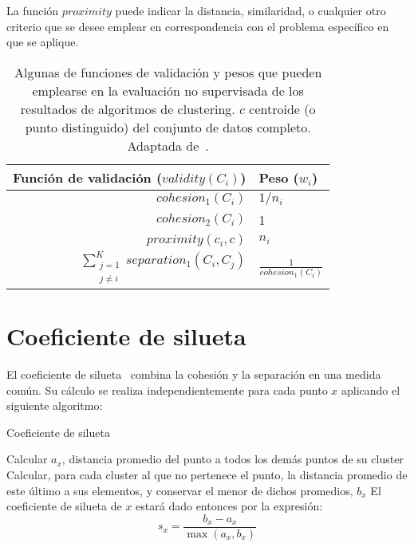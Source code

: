 La función $proximity$ puede indicar la distancia, similaridad, o cualquier otro criterio que se desee emplear en correspondencia con el problema específico en que se aplique.

\begin{table}[H]
    \centering
    \begin{tabular}{rl}
        \hline
        Función de validación ($validity(C_i)$)                        & Peso ($w_i$)                            \\                 \hline
        $cohesion_1(C_i)$                                              & $1/n_i$                                 \\
        $cohesion_2(C_i)$                                              & 1                                       \\
        $proximity(c_i , c)$                                           & $n_i$                                   \\
        $\sum_{\substack{j=1 \\ j\neq i}}^{K}{separation_1(C_i, C_j)}$ & $\frac{1}{cohesion_1(C_i)}$
    \end{tabular}
    \caption{Algunas de funciones de validación y pesos que pueden emplearse en la evaluación no supervisada de los resultados de algoritmos de clustering. $c$ centroide (o punto distinguido) del conjunto de datos completo.
    Adaptada de~\cite{Tan05}.}
    \label{table:validity-weights}
\end{table}

\section{Coeficiente de silueta}\label{sec:coeficienteDeSilueta}

El coeficiente de silueta~\cite{Rousseeuw87, Tan05} combina la cohesión y la separación en una medida común.
Su cálculo se realiza independientemente para cada punto $x$ aplicando el siguiente algoritmo:

\begin{algorithm}
    \caption{Coeficiente de silueta}
    \label{algorithm:silohuette-coefficient}
    Calcular $a_x$, distancia promedio del punto a todos los demás puntos de su cluster\;
    Calcular, para cada cluster al que no pertenece el punto, la distancia promedio de este último a sus elementos, y conservar el menor de dichos promedios, $b_x$\;
    El coeficiente de silueta de $x$ estará dado entonces por la expresión:
    \begin{equation*}
        s_x = \frac{b_x - a_x}{\max{(a_x, b_x)}}
    \end{equation*}
\end{algorithm}

